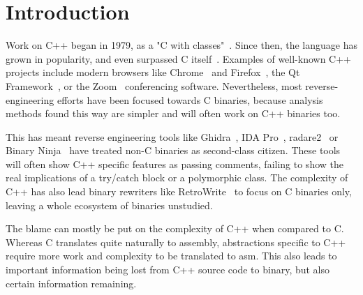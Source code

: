 \documentclass[a4paper,11pt,oneside]{report}
\begin{document}

\maketoc

\chapter{Introduction}



Work on C++ began in 1979, as a "C with classes"~\cite{cwithclasses}.
Since then, the language has grown in popularity, and even surpassed C 
itself~\cite{stackoverflowpopularity}.
Examples of well-known C++ projects include modern browsers like 
Chrome~\cite{chrome} and Firefox~\cite{firefox}, the Qt Framework~\cite{qt}, or 
the Zoom~\cite{zoom} conferencing software.
Nevertheless, most reverse-engineering efforts have been focused towards C
binaries, because analysis methods found this way are simpler and will often
work on C++ binaries too.

This has meant reverse engineering tools like Ghidra~\cite{ghidra}, IDA 
Pro~\cite{ida}, radare2~\cite{radare} or Binary Ninja~\cite{binja} have
treated non-C binaries as second-class citizen.
These tools will often show C++ specific features as passing comments, failing 
to show the real implications of a try/catch block or a polymorphic class.
The complexity of C++ has also lead binary rewriters like
RetroWrite~\cite{dinesh20oakland} to focus on C binaries only, leaving a whole
ecosystem of binaries unstudied.

The blame can mostly be put on the complexity of C++ when compared to C.
Whereas C translates quite naturally to assembly, abstractions specific to C++ 
require more work and complexity to be translated to asm.
This also leads to important information being lost from C++ source code to 
binary, but also certain information remaining.
\end{document}
